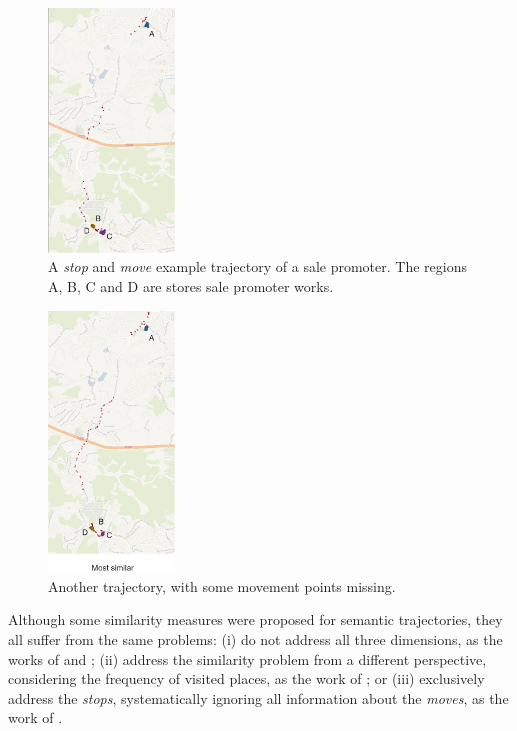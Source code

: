 \documentclass[12pt]{article}
\begin{document}
\begin{figure}[h]
\centering
\includegraphics[width=0.3\textwidth]{Images/Involves-Trajectory.jpg}
\caption{\label{fig:involves_single_semantic_trajectory}A \emph{stop} and \emph{move} example trajectory of a sale promoter. The regions A, B, C and D are stores sale promoter works.}
\end{figure}

\begin{figure}[h]
\centering
\includegraphics[width=0.3\textwidth]{Images/Involves-MostSimilarTrajectory.jpg}
\caption{\label{fig:involves_similar_semantic_trajectory}Another trajectory, with some movement points missing.}
\end{figure}

Although some similarity measures were proposed for semantic trajectories, they all suffer from the same problems: (i) do not address all three dimensions, as the works of \cite{Kang:2009:SMT:1529282.1529580} and \cite{Liu:2012:SMM:2442968.2442971}; (ii) address the similarity problem from a different perspective, considering the frequency of visited places, as the work of \cite{Ying:2010:MUS:1867699.1867703}; or (iii) exclusively address the \emph{stops}, systematically ignoring all information about the \emph{moves}, as the work of \cite{Furtado:TGIS12156}.
\end{document}
